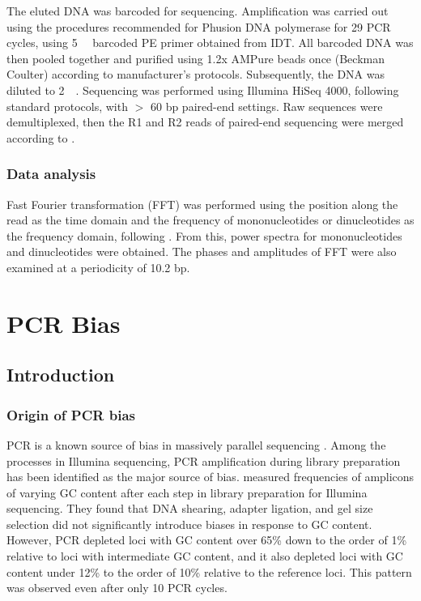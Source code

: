 \documentclass[a4paper, numbers=noenddot]{scrbook}
\begin{document}
The eluted DNA was barcoded for sequencing.  Amplification was carried out using the procedures recommended for Phusion DNA polymerase for 29 PCR cycles, using \SI{5}{\micro\Molar} barcoded PE primer obtained from IDT.  All barcoded DNA was then pooled together and purified using 1.2x AMPure beads once (Beckman Coulter) according to manufacturer's protocols.  Subsequently, the DNA was diluted to \SI{2}{\nano\Molar}.  Sequencing was performed using Illumina HiSeq 4000, following standard protocols, with $>$ 60 bp paired-end settings.  Raw sequences were demultiplexed, then the R1 and R2 reads of paired-end sequencing were merged according to \citet{zhu_interaction_2018}.

\subsection{Data analysis}
\label{ssec:emsaselex_methods_anal}

Fast Fourier transformation (FFT) was performed using the position along the read as the time domain and the frequency of mononucleotides or dinucleotides as the frequency domain, following \citet{zhu_interaction_2018}.  From this, power spectra for mononucleotides and dinucleotides were obtained.  The phases and amplitudes of FFT were also examined at a periodicity of 10.2 bp.

\chapter{PCR Bias}
\label{ch:pcrbias}

\section{Introduction}
\label{sec:pcrbias_intro}

\subsection{Origin of PCR bias}
\label{ssec:pcrbias_intro_origin}

PCR is a known source of bias in massively parallel sequencing \citep{olova_comparison_2018}.  Among the processes in Illumina sequencing, PCR amplification during library preparation has been identified as the major source of bias.  \citet{aird_analyzing_2011} measured frequencies of amplicons of varying GC content after each step in library preparation for Illumina sequencing.  They found that DNA shearing, adapter ligation, and gel size selection did not significantly introduce biases in response to GC content.  However, PCR depleted loci with GC content over 65\% down to the order of 1\% relative to loci with intermediate GC content, and it also depleted loci with GC content under 12\% to the order of 10\% relative to the reference loci.  This pattern was observed even after only 10 PCR cycles.
\end{document}
